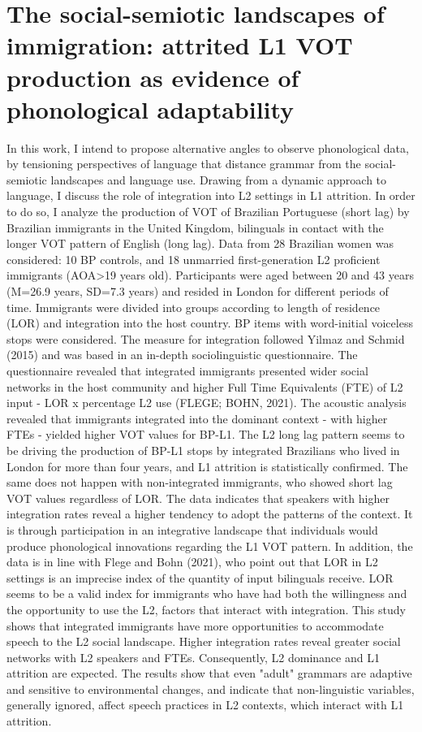 \chapter{The social-semiotic landscapes of immigration: attrited L1 VOT production as evidence of phonological adaptability}\label{ch:felipefloresk1}
\begin{affils}
\end{affils}

In this work, I intend to propose alternative angles to observe phonological data, by tensioning perspectives of language that distance grammar from the social-semiotic landscapes and language use. Drawing from a dynamic approach to language, I discuss the role of integration into L2 settings in L1 attrition. In order to do so, I analyze the production of VOT of Brazilian Portuguese (short lag) by Brazilian immigrants in the United Kingdom, bilinguals in contact with the longer VOT pattern of English (long lag). Data from 28 Brazilian women was considered: 10 BP controls, and 18 unmarried first-generation L2 proficient immigrants (AOA>19 years old). Participants were aged between 20 and 43 years (M=26.9 years, SD=7.3 years) and resided in London for different periods of time. Immigrants were divided into groups according to length of residence (LOR) and integration into the host country. BP items with word-initial voiceless stops were considered. The measure for integration followed Yilmaz and Schmid (2015) and was based in an in-depth sociolinguistic questionnaire. The questionnaire revealed that integrated immigrants presented wider social networks in the host community and higher Full Time Equivalents (FTE) of L2 input - LOR x percentage L2 use (FLEGE; BOHN, 2021). The acoustic analysis revealed that immigrants integrated into the dominant context - with higher FTEs - yielded higher VOT values for BP-L1. The L2 long lag pattern seems to be driving the production of BP-L1 stops by integrated Brazilians who lived in London for more than four years, and L1 attrition is statistically confirmed. The same does not happen with non-integrated immigrants, who showed short lag VOT values regardless of LOR. The data indicates that speakers with higher integration rates reveal a higher tendency to adopt the patterns of the context. It is through participation in an integrative landscape that individuals would produce phonological innovations regarding the L1 VOT pattern. In addition, the data is in line with Flege and Bohn (2021), who point out that LOR in L2 settings is an imprecise index of the quantity of input bilinguals receive. LOR seems to be a valid index for immigrants who have had both the willingness and the opportunity to use the L2, factors that interact with integration. This study shows that integrated immigrants have more opportunities to accommodate speech to the L2 social landscape. Higher integration rates reveal greater social networks with L2 speakers and FTEs. Consequently, L2 dominance and L1 attrition are expected. The results show that even "adult" grammars are adaptive and sensitive to environmental changes, and indicate that non-linguistic variables, generally ignored, affect speech practices in L2 contexts, which interact with L1 attrition.

